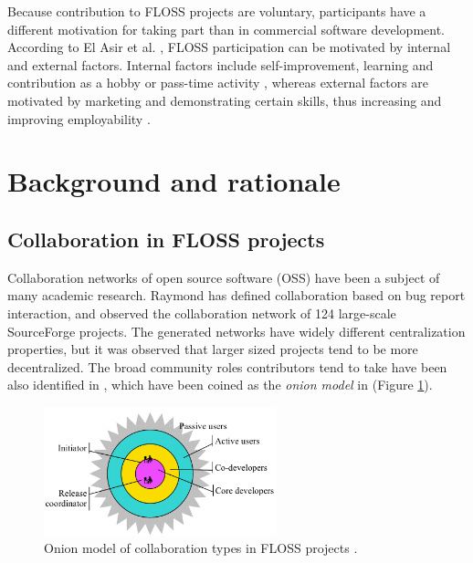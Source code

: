 Because contribution to FLOSS projects are voluntary, participants have a different motivation for taking part than in commercial software development. According to El Asir et al. \cite{elasriPeripheryCoreTemporal2017}, FLOSS participation can be motivated by internal and external factors. Internal factors include self-improvement, learning and contribution as a hobby or pass-time activity  \cite{alexanderharsWorkingFreeMotivations2002,yunwenyeUnderstandingMotivationOpen2003}, whereas external factors are motivated by marketing and demonstrating certain skills, thus increasing and improving employability \cite{alexanderharsWorkingFreeMotivations2002}.

\section{Background and rationale}

\subsection{Collaboration in FLOSS projects}
Collaboration networks of open source software (OSS) have been a subject of many academic research. Raymond \cite{crowstonSocialStructureFree2005} has defined collaboration based on bug report interaction, and observed the collaboration network of 124 large-scale SourceForge projects. The generated networks have widely different centralization properties, but it was observed that larger sized projects tend to be more decentralized. The broad community roles contributors tend to take have been also identified in \cite{crowstonSocialStructureFree2005}, which have been coined as the \textit{onion model} in \cite{martinez-romoUsingSocialNetwork2008} (Figure \ref{fig:onion1}).

\begin{figure}
    \centering
    \includegraphics[width=0.6\textwidth]{figures/onion_model.png}
    \caption{Onion model of collaboration types in FLOSS projects \cite{crowstonSocialStructureFree2005}.}
    \label{fig:onion1}
\end{figure}

